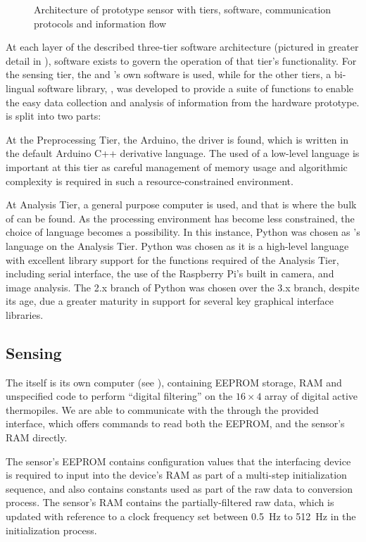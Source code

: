 \documentclass[../thesis/thesis.tex]{subfiles}
\begin{document}
\begin{figure}
\centering

\caption{Architecture of prototype sensor with tiers, software, communication protocols and information flow}
\label{fig:pictures:protob-arch}
\end{figure}

At each layer of the described three-tier software architecture (pictured in greater detail in ), software exists to govern the operation of that tier's functionality. For the sensing tier, the \mlx and \pir's own software is used, while for the other tiers, a bi-lingual software library, \tarl, was developed to provide a suite of functions to enable the easy data collection and analysis of information from the hardware prototype. \tarl is split into two parts:

At the Preprocessing Tier, the Arduino, the \tarl \mlx driver is found, which is written in the default Arduino C++ derivative language. The used of a low-level language is important at this tier as careful management of memory usage and algorithmic complexity is required in such a resource-constrained environment.

At Analysis Tier, a general purpose computer is used, and that is where the bulk of \tarl can be found. As the processing environment has become less constrained, the choice of language becomes a possibility. In this instance, Python was chosen as \tarl's language on the Analysis Tier. Python was chosen as it is a high-level language with excellent library support for the functions required of the Analysis Tier, including serial interface, the use of the Raspberry Pi's built in camera, and image analysis. The 2.x branch of Python was chosen over the 3.x branch, despite its age, due a greater maturity in support for several key graphical interface libraries.

\subsection{Sensing}
The \mlx itself is its own computer (see ), containing EEPROM storage, RAM and unspecified code to perform ``digital filtering'' on the $16 \times 4$ array of digital active thermopiles. We are able to communicate with the \mlx through the provided \iic interface, which offers commands to read both the EEPROM, and the sensor's RAM directly. 

The sensor's EEPROM contains configuration values that the interfacing device is required to input into the device's RAM as part of a multi-step initialization sequence, and also contains constants used as part of the raw data to \dc conversion process. The sensor's RAM contains the partially-filtered raw data, which is updated with reference to a clock frequency set between 0.5~Hz to 512~Hz in the initialization process.
\end{document}
